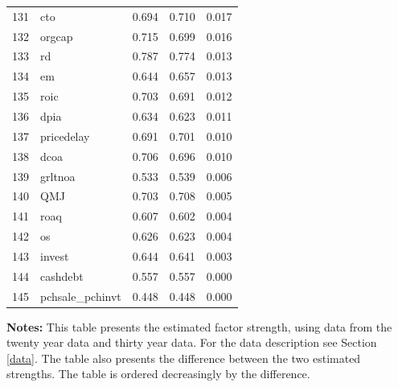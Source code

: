 \begin{footnotesize}
\begin{longtable}{rl|c|c|c}
		131 & cto & 0.694 & 0.710 & 0.017 \\ 
		132 & orgcap & 0.715 & 0.699 & 0.016 \\ 
		133 & rd & 0.787 & 0.774 & 0.013 \\ 
		134 & em & 0.644 & 0.657 & 0.013 \\ 
		135 & roic & 0.703 & 0.691 & 0.012 \\ 
		136 & dpia & 0.634 & 0.623 & 0.011 \\ 
		137 & pricedelay & 0.691 & 0.701 & 0.010 \\ 
		138 & dcoa & 0.706 & 0.696 & 0.010 \\ 
		139 & grltnoa & 0.533 & 0.539 & 0.006 \\ 
		140 & QMJ & 0.703 & 0.708 & 0.005 \\ 
		141 & roaq & 0.607 & 0.602 & 0.004 \\ 
		142 & os & 0.626 & 0.623 & 0.004 \\ 
		143 & invest & 0.644 & 0.641 & 0.003 \\ 
		144 & cashdebt & 0.557 & 0.557 & 0.000 \\ 
		145 & pchsale\_pchinvt & 0.448 & 0.448 & 0.000 \\ 
		\hline
		
	\end{longtable}

			\begin{minipage}{0.7\textwidth}
				
{\footnotesize {\bf Notes:} This table presents the estimated factor strength, using data from the twenty year data and thirty year data. For the data description see Section \ref{data}. 
	The table also presents the difference between the two estimated strengths. 
	The table is ordered decreasingly by the difference. }
\end{minipage}

\end{footnotesize}


\newpage

